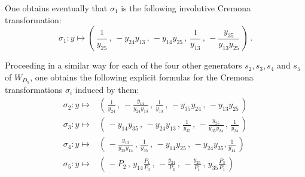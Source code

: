 \documentclass[11pt]{amsart}
\begin{document}
One  obtains eventually that $\sigma_1$ is the following involutive Cremona transformation: 
\begin{equation}
\label{Eq:Formula-Sigma-1}
\sigma_1: y \longmapsto \left(\, \frac{1}{ {y_{25}}}
\, , \, 
 - {y_{24}}  {y_{13}}
 \, , \,  
- {y_{14}}  {y_{25}}
\, , \, 
 \frac{1}{ {y_{13}}}
 \, , \, 
-\frac{ {y_{35}}}{ {y_{13}}  {y_{25}}}
\, \right)\, .
\end{equation}

Proceeding in a similar way for each of the four other generators $s_2,s_3,s_4$ and $s_5$ of $W_{D_5}$, one obtains the following explicit formulas for  the Cremona transformations $\sigma_i$ induced by them:
%
%
\begin{align}
\label{Eq:Formula-Sigma-k}
\sigma_2: y \longmapsto &  \left(\, 
\frac{1}{ {y_{24}}} 
\, , \, 
-\frac{ {y_{14}}}{ {y_{24}}  {y_{13}}}
 \, , \, 
\frac{1}{ {y_{13}}}
 \, , \,  - {y_{35}}  {y_{24}}
  \, , \, 
- {y_{13}}  {y_{25}}
\, \right)
\nonumber 
\\
\sigma_3: y \longmapsto &  \left(\, 
- {y_{14}}  {y_{35}}
 \, , \,
  - {y_{24}}  {y_{13}}
   \, , \,
\frac{1}{ {y_{35}}}
 \, , \,
-\frac{ {y_{25}}}{ {y_{35}}  {y_{24}}}
 \, , \, 
\frac{1}{ {y_{24}}}
\, \right)
\\
\sigma_4: y \longmapsto &  \left(\, 
-\frac{ {y_{13}}}{ {y_{35}}  {y_{14}}}
 \, , \,
\frac{1}{ {y_{35}}}
 \, , \,
 - {y_{14}}  {y_{25}}
  \, , \,
- {y_{24}}  {y_{35}}, \frac{1}{ {y_{14}}}
\, \right)
\nonumber
\\
\sigma_5: y \longmapsto &  \left(\, 
 -P_2
\, , \,  
 {y_{14}}
\frac{P_1}{P_3}
\, , \,  
-  \frac{ {y_{24}}}{P_3}
 \, , \,  
-\frac{ {y_{25}}}{P_1}
\, , \,   {y_{35}} 
\frac{P_3}{P_1}
\, \right)
\nonumber
\end{align}
\end{document}
